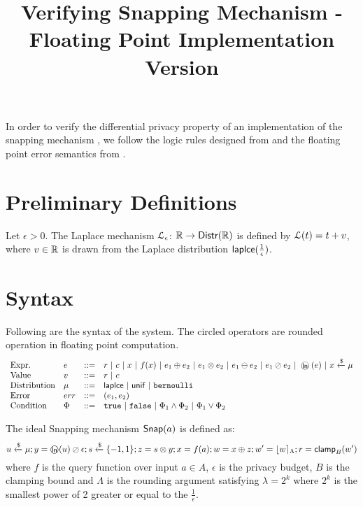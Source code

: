 \documentclass[a4paper,11pt]{article}
\begin{document}
\title{Verifying Snapping Mechanism - Floating Point Implementation Version}
\author{}

\date{}

\maketitle
In order to verify the differential privacy property of an implementation of the snapping mechanism \cite{mironov2012significance}, we follow the logic rules designed from \cite{barthe2016proving} and the floating point error semantics from \cite{Ramananandro2016unified,Martel2006higher,Becker2018verified,Moscato2017Automatic}.

\section{Preliminary Definitions}
\begin{defn}
Let $\epsilon > 0$. The Laplace mechanism  $\mathcal{L}_{\epsilon}$: $\mathbb{R} \to \mathsf{Distr}(\mathbb{R})$ is defined by $\mathcal{L}(t) = t + v$, where $v \in \mathbb{R}$ is drawn from the Laplace distribution $\mathsf{laplce}(\frac{1}{\epsilon})$.
\end{defn}
%
%
%
\section{Syntax}
Following are the syntax of the system. The circled operators are rounded operation in floating point computation.
\[\begin{array}{llll}
\mbox{Expr.} & \expr & ::= & \valr ~|~ \valf
	~|~ x ~|~ f(x) ~|~ \expr_1 \oplus \expr_2 
	~|~ \expr_1 \otimes \expr_2 ~|~ \expr_1 \ominus \expr_2 
	~|~ \expr_1 \oslash \expr_2 ~|~ \oln (\expr) ~|~ x \samplel \edistr \\
%
\mbox{Value} & \valv & ::= & \valr ~|~  \valf \\
%
\mbox{Distribution} & \edistr & ::= & \laplace ~|~ \uniform ~|~ \bernoulli \\ 
%
\mbox{Error} & \err & ::= & (\expr_1, \expr_2) \\

\mbox{Condition} & \condition & ::= & 
	\etrue ~|~ \efalse ~|~ \condition_1 \land \condition_2 
	~|~ \condition_1 \lor \condition_2

\end{array}\]


\begin{defn}
The ideal Snapping mechanism $\mathsf{Snap}( a)$ is defined as:
\[
	u \xleftarrow{\$} \edistr; y = \oln (u) \oslash \epsilon; s \samplel \{-1, 1\}; z = s \otimes y; x = f(a); w = x \oplus z; w' = \round{w}_{\Lambda}; r = \clamp_B (w')
\]
where $f$ is the query function over input $a \in A$, $\epsilon$ is the privacy budget, $B$ is the clamping bound and $\Lambda$ is the rounding argument satisfying $\lambda = 2^k$ where $2^k$ is the smallest power of 2 greater or equal to the $\frac{1}{\epsilon}$.
\end{defn}
\end{document}
